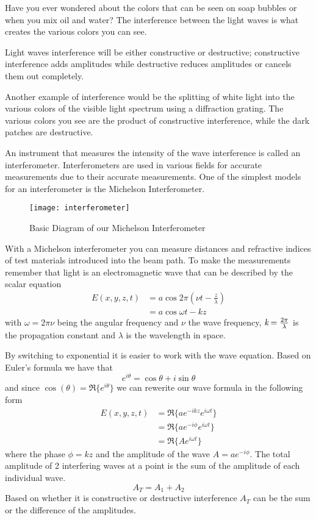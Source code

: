 	Have you ever wondered about the colors that can be seen on soap bubbles or when you mix oil and water? The interference between the light waves is what creates the various colors you can see.

	Light waves interference will be either constructive or destructive; constructive interference adds amplitudes while destructive reduces amplitudes or cancels them out completely.

	Another example of interference would be the splitting of white light into the various colors of the visible light spectrum using a diffraction grating. The various colors you see are the product of constructive interference, while the dark patches are destructive.

    An instrument that measures the intensity of the wave interference is called an interferometer. Interferometers are used in various fields for accurate measurements due to their accurate measurements. One of the simplest models for an interferometer is the Michelson Interferometer.

\begin{figure}[ht]
\centering
\texttt{[image: interferometer]}
\caption{Basic Diagram of our Michelson Interferometer}
\label{fig:interferometerdiagram}
\end{figure}


	With a Michelson interferometer you can measure distances and refractive indices of test materials introduced into the beam path. To make the measurements remember that light is an electromagnetic wave that can be described by the scalar equation
	\begin{align}\label{eqn:EMWave}
		\nonumber E(x,y,z,t) &= a\cos{2\pi(\nu t-\frac{z}{\lambda})} \\
		&= a\cos{\omega t-kz}
	\end{align}
with $\omega=2\pi\nu$ being the angular frequency and $\nu$ the wave frequency, $\emph{k}=\frac{2\pi}{\lambda}$ is the propagation constant and $\lambda$ is the wavelength in space.  

	By switching to exponential it is easier to work with the wave equation. Based on Euler’s formula we have that 
	\begin{equation}\label{eqn:Euler's}
		e^{i\theta} = \cos{\theta} + i \sin{\theta}
	\end{equation}
and since $\cos(\theta)=\Re\{e^{i\theta}\}$ we can rewerite our wave formula in the following form
	\begin{align}\label{eqn:TrigEMWave}
		\nonumber E(x,y,z,t) &=\Re\{a e^{-ikz} e^{i\omega t}\} \\
		\nonumber &=\Re\{a e^{-i\phi} e^{i\omega t}\} \\
		&=\Re\{A e^{i\omega t}\}
	\end{align}
where the phase $\phi=kz$ and the amplitude of the wave $A=ae^{-i\phi}$. The total amplitude of 2 interfering waves at a point is the sum of the amplitude of each individual wave.
	\begin{equation}\label{eqn:Amplitude}
		A_{T}=A_{1}+A_{2}
	\end{equation}
Based on whether it is constructive or destructive interference $A_T$ can be the sum or the difference of the amplitudes. 

